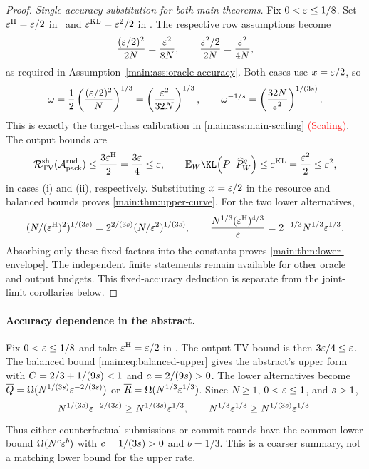 \begin{proof}
\emph{Single-accuracy substitution for both main theorems.}
Fix $0<\varepsilon\le1/8$. Set
$\varepsilon^{\mathrm H}=\varepsilon/2$ in \HellingerCase\ and
$\varepsilon^{\mathrm{KL}}=\varepsilon^2/2$ in \KLCase.
The respective row assumptions become
\[
 \frac{(\varepsilon/2)^2}{2N}
 =\frac{\varepsilon^2}{8N},
 \qquad
 \frac{\varepsilon^2/2}{2N}
 =\frac{\varepsilon^2}{4N},
\]
as required in Assumption~\ref{main:ass:oracle-accuracy}.
Both cases use $x=\varepsilon/2$, so
\[
 \omega=\frac12\left(\frac{(\varepsilon/2)^2}{N}\right)^{1/3}
 =\left(\frac{\varepsilon^2}{32N}\right)^{1/3},
 \qquad
 \omega^{-1/s}
 =\left(\frac{32N}{\varepsilon^2}\right)^{1/(3s)}.
\]
This is exactly the target-class calibration in
\textcolor{red}{\cref{main:ass:main-scaling} (Scaling)}. The output bounds are
\[
 \SharedRisk(\RandomizedPackedSampler)
 \le\frac{3\OracleRadius}{2}
 =\frac{3\TargetTolerance}{4}\le\TargetTolerance,
 \qquad
 \mathbb E_W\KLDivergence{\TargetLaw}
 {\SamplerOutputLaw{W}{\FrozenOracle}}
 \le\KLTargetTolerance
 =\frac{\TargetTolerance^2}{2}\le\TargetTolerance^2,
\]
in cases (i) and (ii), respectively. Substituting $x=\varepsilon/2$
in the resource and balanced bounds proves
\cref{main:thm:upper-curve}.
For the two lower alternatives,
\[
 (N/(\varepsilon^{\mathrm H})^2)^{1/(3s)}
 =2^{2/(3s)}
   (N/\varepsilon^2)^{1/(3s)},
 \qquad
 \frac{N^{1/3}(\varepsilon^{\mathrm H})^{4/3}}{\varepsilon}
 =2^{-4/3}N^{1/3}\varepsilon^{1/3}.
\]
Absorbing only these fixed factors into the constants proves
\cref{main:thm:lower-envelope}. The independent finite statements
remain available for other oracle and output budgets.
\ifincludeexponents
This fixed-accuracy deduction is separate from the joint-limit
corollaries below.
\fi
\end{proof}

\paragraph{Accuracy dependence in the abstract.}
Fix $0<\varepsilon\le1/8$ and take
$\varepsilon^{\mathrm H}=\varepsilon/2$ in \HellingerCase.
The output TV bound is then $3\varepsilon/4\le\varepsilon$.
The balanced bound \eqref{main:eq:balanced-upper} gives the abstract's
upper form with $C=2/3+1/(9s)<1$ and
$a=2/(9s)>0$.
The lower alternatives become
$\overline Q=\Omega(N^{1/(3s)}
\varepsilon^{-2/(3s)})$ or
$\overline R=\Omega(N^{1/3}\varepsilon^{1/3})$.
Since $N\ge1$, $0<\varepsilon\le1$, and $s>1$,
\[
 N^{1/(3s)}\varepsilon^{-2/(3s)}
 \ge N^{1/(3s)}\varepsilon^{1/3},
 \qquad
 N^{1/3}\varepsilon^{1/3}
 \ge N^{1/(3s)}\varepsilon^{1/3}.
\]
Thus either counterfactual submissions or commit rounds have the common
lower bound $\Omega(N^c\varepsilon^b)$ with
$c=1/(3s)>0$ and $b=1/3$.
This is a coarser summary, not a matching lower bound for the upper rate.

\ifincludeexponents

\fi
